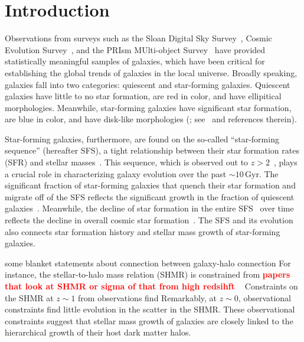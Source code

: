 \documentclass[12pt, letterpaper, preprint, tighten]{aastex62}
\newcommand{\todo}[1]{{\bf \textcolor{red}{#1}}}
\newcommand{\ch}[1]{\color{orange}{\bf CH:} #1}
\begin{document}
\section{Introduction}
Observations from surveys such as the Sloan Digital Sky 
Survey~\citep[SDSS;][]{york2000}, Cosmic Evolution
Survey~\citep[COSMOS;][]{scoville2007},
and the PRIsm MUlti-object Survey~\citep[PRIMUS;][]{coil2011, cool2013} 
have provided statistically meaningful samples of galaxies, 
which have been critical for establishing the global trends of 
galaxies in the local universe. Broadly speaking, galaxies 
fall into two categories: quiescent and star-forming galaxies. 
Quiescent galaxies have little to no star formation, are red 
in color, and have ellipitical morphologies. Meanwhile, 
star-forming galaxies have significant star formation, are blue 
in color, and have disk-like morphologies (\citealt{kauffmann2003, blanton2003, baldry2006, taylor2009, moustakas2013}; 
see~\citealt{blanton2009} and references therein). 

Star-forming galaxies, furthermore, are found on the so-called 
``star-forming sequence'' (hereafter SFS), a tight relationship 
between their star formation rates (SFR) and stellar 
masses~\citep[][see also Figure~\ref{fig:groupcat}]{noeske2007, daddi2007, salim2007, speagle2014, lee2015}.
This sequence, which is observed out to $z > 2$~\citep{wang2013, 
leja2015, schreiber2015}, plays a crucial role in characterizing 
galaxy evolution over the past ${\sim}10\,\mathrm{Gyr}$. 
The significant fraction of star-forming galaxies that quench their 
star formation and migrate off of the SFS reflects the significant 
growth in the fraction of quiescent galaxies~\citep{blanton2006, borch2006, bundy2006, moustakas2013}. 
Meanwhile, the decline of star formation in the entire SFS~\citep{lee2015, schreiber2015} 
over time reflects the decline in overall cosmic star formation~\citep{hopkins2006, behroozi2013a, madau2014}.
The SFS and its evolution also connects star formation history
and stellar mass growth of star-forming galaxies. 


{\ch some blanket statements about connection between galaxy-halo connection} 
For instance, the stellar-to-halo mass relation (SHMR) is constrained
from 
\todo{papers that look at SHMR or sigma of that from high redsihft }
~\citep{mandelbaum2006a, conroy2007, more2011, leauthaud2012, tinker2013, velander2014, han2015, zu2015, gu2016}
Constraints on the SHMR at $z\sim 1$ from observations find 
Remarkably, at $z\sim 0$, observational constraints find little 
evolution in the scatter in the SHMR. 
These observational constraints suggest that stellar mass growth 
of galaxies are closely linked to the hierarchical growth of their 
host dark matter halos. 
\end{document}
